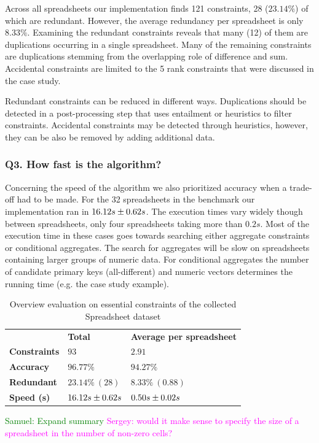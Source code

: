 \documentclass{IEEEtran}
\newcommand{\sergey}[1]{\textcolor{magenta}{{\sc Sergey:} #1}\xspace}
\newcommand{\samuel}[1]{\textcolor{green}{{\sc Samuel:} #1}\xspace}
\theoremstyle{definition}
\begin{document}
Across all spreadsheets our implementation finds 121 constraints, 28 ($23.14\%$) of which are redundant.
However, the average redundancy per spreadsheet is only $8.33\%$.
Examining the redundant constraints reveals that many (12) of them are duplications occurring in a single spreadsheet.
Many of the remaining constraints are duplications stemming from the overlapping role of difference and sum.
Accidental constraints are limited to the 5 rank constraints that were discussed in the case study.

Redundant constraints can be reduced in different ways.
Duplications should be detected in a post-processing step that uses entailment or heuristics to filter constraints.
Accidental constraints may be detected through heuristics, however, they can be also be removed by adding additional data.

\subsubsection*{Q3. How fast is the algorithm?}
Concerning the speed of the algorithm we also prioritized accuracy when a trade-off had to be made.
For the 32 spreadsheets in the benchmark our implementation ran in ${16.12}s \pm {0.62}s$.
The execution times vary widely though between spreadsheets, only four spreadsheets taking more than $0.2s$.
Most of the execution time in these cases goes towards searching either aggregate constraints or conditional aggregates.
The search for aggregates will be slow on spreadsheets containing larger groups of numeric data.
For conditional aggregates the number of candidate primary keys (all-different) and numeric vectors determines the running time (e.g. the case study example).

\begin{table}
  \centering
  \begin{tabular}{lll}
    & \textbf{Total} & \textbf{Average per spreadsheet} \\
    \textbf{Constraints} & $93$ & $2.91$ \\
    \textbf{Accuracy} & $96.77\%$ & $94.27\%$ \\
    \textbf{Redundant} & $23.14\%~(28)$ & $8.33\%~(0.88)$ \\
    \textbf{Speed (s)} & ${16.12}s \pm {0.62}s$ & ${0.50}s \pm {0.02}s$
  \end{tabular}
  \caption{Overview evaluation on essential constraints of the collected Spreadsheet dataset}
\end{table}
\samuel{Expand summary}
\sergey{would it make sense to specify the size of a spreadsheet in the number of non-zero cells?}
\end{document}
